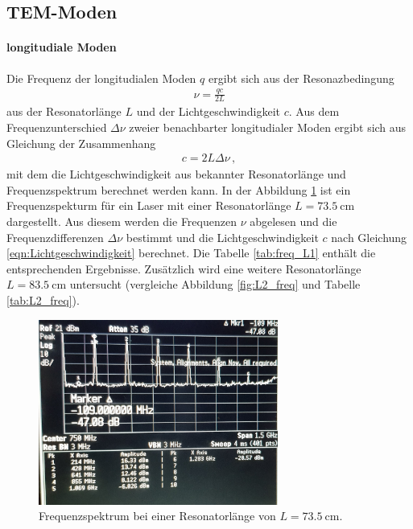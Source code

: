 \subsection{TEM-Moden}
\label{subsec:tem}
\paragraph{longitudiale Moden}
Die Frequenz der longitudialen Moden $q$
ergibt sich aus der Resonazbedingung
\begin{align}
  \nu=\frac{qc}{2L} \label{eqn:longi_mode}
\end{align}
aus der Resonatorlänge $L$ und der Lichtgeschwindigkeit $c$.
Aus dem Frequenzunterschied $\Delta \nu$ zweier benachbarter longitudialer Moden
ergibt sich aus Gleichung \label{eqn:longi_mode} der Zusammenhang
\begin{align}
  c = 2L\Delta \nu \, ,  \label{eqn:Lichtgeschwindigkeit}
\end{align}
mit dem die Lichtgeschwindigkeit aus bekannter Resonatorlänge und Frequenzspektrum
berechnet werden kann.
In der Abbildung \ref{fig:L1_freq} ist ein Frequenzspekturm für ein Laser mit einer Resonatorlänge $L=\SI{73.5}{\centi\meter}$
dargestellt. Aus diesem werden die Frequenzen $\nu$ abgelesen
 und die Frequenzdifferenzen $\Delta \nu $ bestimmt und die Lichtgeschwindigkeit $c$ nach Gleichung \ref{eqn:Lichtgeschwindigkeit}
berechnet.
Die Tabelle \ref{tab:freq_L1} enthält die entsprechenden Ergebnisse.
Zusätzlich wird eine weitere Resonatorlänge $L = \SI{83.5}{\centi\meter}$  untersucht
(vergleiche Abbildung \ref{fig:L2_freq} und Tabelle \ref{tab:L2_freq}).

\begin{figure}
\centering
  \includegraphics[width=0.7\textwidth]{pictures/freq_1.jpg}
  \caption{Frequenzspektrum bei einer Resonatorlänge von $L=\SI{73.5}{\centi\meter}$.}
  \label{fig:L1_freq}
\end{figure}

